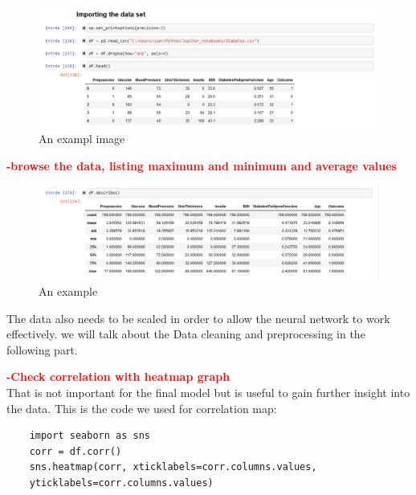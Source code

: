 \begin{figure}[htp]
    \centering
    \includegraphics[width=1.5\textwidth]{images/dataframe.png}
    \caption{An exampl image}
    \label{fig:example1}
\end{figure}


\textcolor{red}{\textbf{-browse the data, listing maximum and minimum and average values}}

\begin{figure}[htp]
    \centering
    \includegraphics[width=1.3\textwidth]{images/dataframe-description.png}
    \caption{An example }
    \label{fig:example2}
\end{figure}

The data also needs to be scaled in order to allow the neural network to work effectively.
we will talk about the Data cleaning and preprocessing in the following part.

\newpage
\textcolor{red}{\textbf{-Check correlation with heatmap graph}}\\
That is not important for the final model but is useful to 
gain further insight into the data.
This is the code we used for correlation map:

\begin{lstlisting}
    import seaborn as sns
    corr = df.corr()
    sns.heatmap(corr, xticklabels=corr.columns.values,
    yticklabels=corr.columns.values)
 \end{lstlisting}


